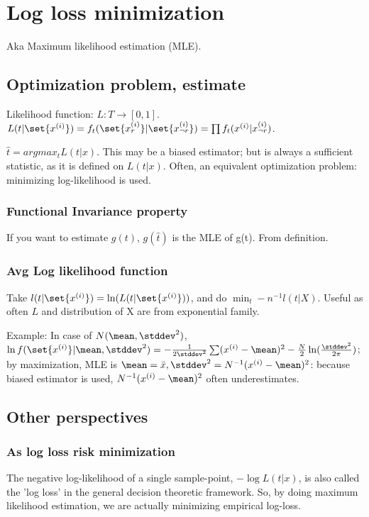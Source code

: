 \documentclass[oneside, article]{memoir}
\begin{document}
\section{Log loss minimization}
Aka Maximum likelihood estimation (MLE).

\subsection{Optimization problem, estimate}
Likelihood function: $L:T \to [0,1]$. \\
$L(t|\set{x^{(i)}}) = f_t(\set{x_r^{(i)}}|\set{x_{\lnot r}^{(i)}}) = \prod f_t(x^{(i)}|x_{\lnot r}^{(i)})$.

$\hat{t} = argmax_{t} L(t|x)$. This may be a biased estimator; but is always a sufficient statistic, as it is defined on $L(t|x)$. Often, an equivalent optimization problem: minimizing log-likelihood is used.

\subsubsection{Functional Invariance property}
If you want to estimate $g(t)$, $g(\hat{t})$ is the MLE of g(t). From definition.

\subsubsection{Avg Log likelihood function}
Take $l(t|\set{x^{(i)}}) = \ln(L(t|\set{x^{(i)}}))$, and do $\min_t -n^{-1}l(t|X)$. Useful as often $L$ and distribution of X are from exponential family.

Example: In case of $N(\mean, \stddev^{2})$, $\ln f(\set{x^{(i)}}|\mean, \stddev^{2}) = -\frac{1}{2\stddev^{2}}\sum(x^{(i)} - \mean)^{2} - \frac{N}{2}\ln (\frac{\stddev^{2}}{2 \pi})$; by maximization, MLE is $\mean = \bar{x}, \stddev^{2}= N^{-1}(x^{(i)} - \mean)^{2}$: because biased estimator is used, $N^{-1}(x^{(i)} - \mean)^{2}$ often underestimates.

\subsection{Other perspectives}
\subsubsection{As log loss risk minimization}
The negative log-likelihood of a single sample-point, $-\log L(t|x)$, is also called the 'log loss' in the general decision theoretic framework. So, by doing maximum likelihood estimation, we are actually minimizing empirical log-loss.
\end{document}

